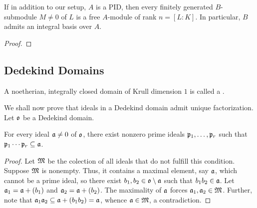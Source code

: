 \begin{proposition}
    If in addition to our setup, $A$ is a PID, then every finitely generated $B$-submodule $M\ne 0$ of $L$ is a free $A$-module of rank $n = [L : K]$. In particular, $B$ admits an integral basis over $A$.
\end{proposition}
\begin{proof}
\end{proof}

\subsection{Dedekind Domains}

\begin{definition}
    A noetherian, integrally closed domain of Krull dimension $1$ is called a .
\end{definition}

We shall now prove that ideals in a Dedekind domain admit unique factorization. Let $\mathfrak{o}$ be a Dedekind domain.

\begin{lemma}
    For every ideal $\mathfrak{a}\ne 0$ of $\mathfrak{o}$, there exist nonzero prime ideals $\mathfrak{p}_1,\dots,\mathfrak{p}_r$ such that $\mathfrak{p}_1\cdots\mathfrak{p}_r\subseteq\mathfrak{a}$.
\end{lemma}
\begin{proof}
    Let $\mathfrak{M}$ be the colection of all ideals that do not fulfill this condition. Suppose $\mathfrak{M}$ is nonempty. Thus, it contains a maximal element, say $\mathfrak{a}$, which cannot be a prime ideal, so there exist $b_1,b_2\in\mathfrak{o}\setminus\mathfrak{a}$ such that $b_1b_2\in\mathfrak{a}$. Let $\mathfrak{a}_1 = \mathfrak{a} + (b_1)$ and $\mathfrak{a}_2 = \mathfrak{a} + (b_2)$. The maximality of $\mathfrak{a}$ forces $\mathfrak{a}_1,\mathfrak{a}_2\in\mathfrak{M}$. Further, note that $\mathfrak{a}_1\mathfrak{a}_2\subseteq\mathfrak{a} + (b_1b_2) = \mathfrak{a}$, whence $\mathfrak{a}\in\mathfrak{M}$, a contradiction.
\end{proof}

